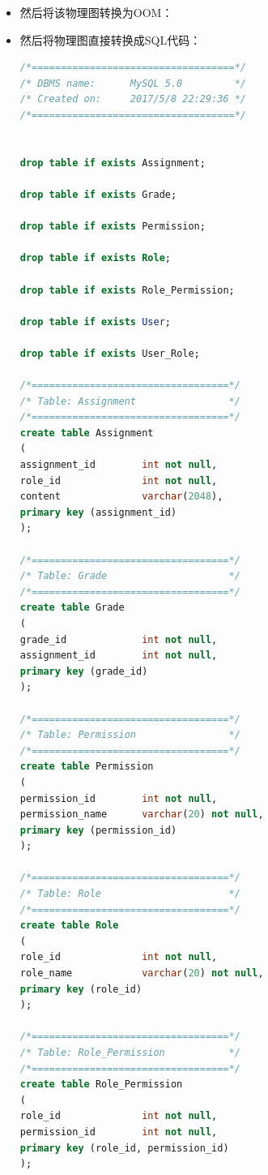 \begin{itemize}
\begin{enumerate}
\begin{itemize}
			\newpage
			
			\item 
			然后将该物理图转换为OOM：
			\begin{minipage}{\textwidth}
				
			\end{minipage}
			
			\newpage
			
			\item
			然后将物理图直接转换成SQL代码：
\begin{lstlisting}[language=sql]
/*===================================*/
/* DBMS name:      MySQL 5.0         */
/* Created on:     2017/5/8 22:29:36 */
/*===================================*/


drop table if exists Assignment;

drop table if exists Grade;

drop table if exists Permission;

drop table if exists Role;

drop table if exists Role_Permission;

drop table if exists User;

drop table if exists User_Role;

/*==================================*/
/* Table: Assignment                */
/*==================================*/
create table Assignment
(
assignment_id        int not null,
role_id              int not null,
content              varchar(2048),
primary key (assignment_id)
);

/*==================================*/
/* Table: Grade                     */
/*==================================*/
create table Grade
(
grade_id             int not null,
assignment_id        int not null,
primary key (grade_id)
);

/*==================================*/
/* Table: Permission                */
/*==================================*/
create table Permission
(
permission_id        int not null,
permission_name      varchar(20) not null,
primary key (permission_id)
);

/*==================================*/
/* Table: Role                      */
/*==================================*/
create table Role
(
role_id              int not null,
role_name            varchar(20) not null,
primary key (role_id)
);

/*==================================*/
/* Table: Role_Permission           */
/*==================================*/
create table Role_Permission
(
role_id              int not null,
permission_id        int not null,
primary key (role_id, permission_id)
);


\end{lstlisting}
\end{itemize}
\end{enumerate}
\end{itemize}
